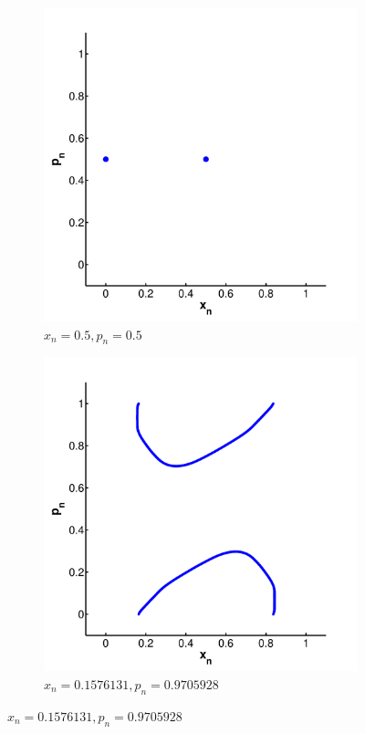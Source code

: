 
\begin{figure}
	\centering
	\begin{subfigure}{0.9\columnwidth}
		\centering
		\includegraphics[width=\textwidth]{./img/assignment_a_0_dim}
		\caption{$x_n = 0.5, p_n = 0.5$}
		\label{fig:experiment:dimension:zero}
	\end{subfigure}

	\begin{subfigure}{0.9\columnwidth}
		\centering
		\includegraphics[width=\textwidth]{./img/assignment_a_1_dim}
		\caption{$x_n = \num{0.1576131}, p_n = \num{0.9705928}$}
		\label{fig:experiment:dimension:one}
	\end{subfigure}


\end{figure}
